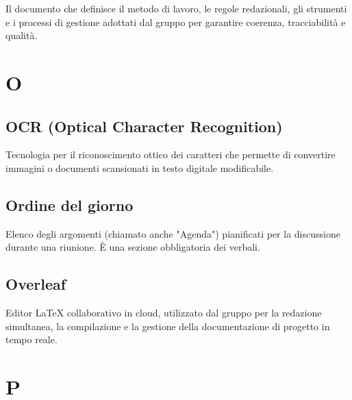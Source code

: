 \documentclass[a4paper, 11pt, oneside]{scrartcl} %
\begin{document}

Il documento che definisce il metodo di lavoro, le regole redazionali, gli strumenti e i processi di gestione adottati dal gruppo per garantire coerenza, tracciabilità e qualità.

\vspace{0.5cm}


\section*{O}


\subsection*{OCR (Optical Character Recognition)}
Tecnologia per il riconoscimento ottico dei caratteri che permette di convertire immagini o documenti scansionati in testo digitale modificabile.
\subsection*{Ordine del giorno}


Elenco degli argomenti (chiamato anche "Agenda") pianificati per la discussione durante una riunione. È una sezione obbligatoria dei verbali.

\subsection*{Overleaf}
Editor LaTeX collaborativo in cloud, utilizzato dal gruppo per la redazione simultanea, la compilazione e la gestione della documentazione di progetto in tempo reale.
\vspace{0.5cm}

\vspace{0.5cm}


\section*{P}

\end{document}
